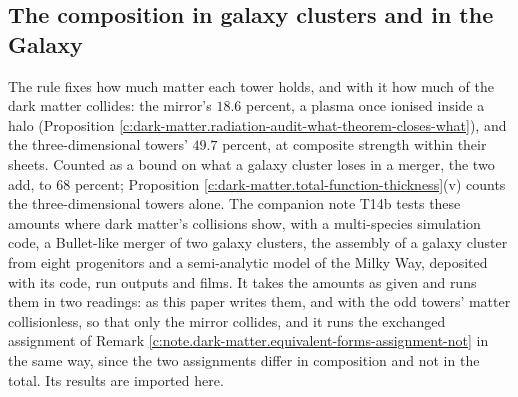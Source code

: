 \documentclass[11pt]{article}
\theoremstyle{definition}
\theoremstyle{plain}
\begin{document}
\subsection*{The composition in galaxy clusters and in the Galaxy}
\label{c:note.dark-matter.setting-composition-galaxy-clusters-galaxy}
The rule fixes how much matter each tower holds, and with it how much of the dark matter collides: the mirror's $18.6$ percent, a plasma once ionised inside a halo (Proposition \ref{c:dark-matter.radiation-audit-what-theorem-closes-what}), and the three-dimensional towers' $49.7$ percent, at composite strength within their sheets. Counted as a bound on what a galaxy cluster loses in a merger, the two add, to $68$ percent; Proposition \ref{c:dark-matter.total-function-thickness}(v) counts the three-dimensional towers alone. The companion note T14b \cite{ButlerT14b} tests these amounts where dark matter's collisions show, with a multi-species simulation code, a Bullet-like merger of two galaxy clusters, the assembly of a galaxy cluster from eight progenitors and a semi-analytic model of the Milky Way, deposited with its code, run outputs and films. It takes the amounts as given and runs them in two readings: as this paper writes them, and with the odd towers' matter collisionless, so that only the mirror collides, and it runs the exchanged assignment of Remark \ref{c:note.dark-matter.equivalent-forms-assignment-not} in the same way, since the two assignments differ in composition and not in the total. Its results are imported here.
\end{document}
